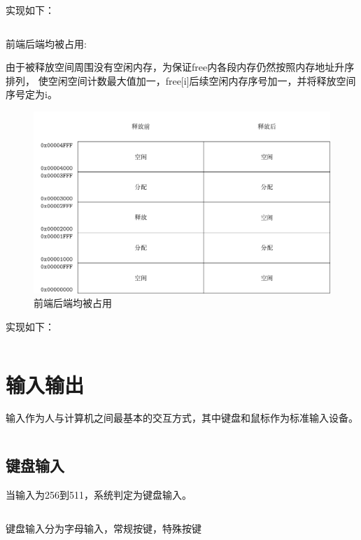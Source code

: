 实现如下：

\begin{listing}[H]
  \inputminted[tabsize=2, firstline=118, lastline=127,
  linenos=true]{c}{../ZOS/src/kernel/memory.c}
\end{listing}

\newpage
前端后端均被占用:

由于被释放空间周围没有空闲内存，为保证free内各段内存仍然按照内存地址升序排列，
使空闲空间计数最大值加一，free[i]后续空闲内存序号加一，并将释放空间序号定为i。
\begin{figure}[h]
  \centering
  \includegraphics[width=.8\textwidth]{fig/mem3.pdf}
  \caption{前端后端均被占用}
  \label{fig:mem4}
\end{figure}

实现如下：
\begin{listing}[H]
  \inputminted[tabsize=2, firstline=128, lastline=141,
  linenos=true]{c}{../ZOS/src/kernel/memory.c}
\end{listing}
\newpage
\section{输入输出}

输入作为人与计算机之间最基本的交互方式，其中键盘和鼠标作为标准输入设备。

\begin{listing}[H]
  \inputminted[tabsize=2, firstline=151, lastline=151,
  linenos=true]{c}{../ZOS/src/kernel/bootpack.c}
\end{listing}


\newpage
\subsection{键盘输入}
当输入为256到511，系统判定为键盘输入。
\begin{listing}[H]
  \inputminted[tabsize=2, firstline=161, lastline=161,
  linenos=true]{c}{../ZOS/src/kernel/bootpack.c}
\end{listing}
键盘输入分为字母输入，常规按键，特殊按键


